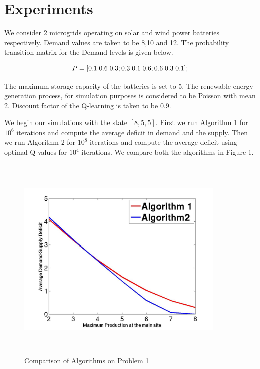 \documentclass[conference]{IEEEtran}
\begin{document}
\section{Experiments}
We consider 2 microgrids operating on solar and wind power batteries respectively. Demand values are taken to be 8,10 and 12. The probability transition matrix for the Demand levels is given below. 

$$ P = [0.1\hspace{0.1cm}0.6\hspace{0.1cm} 0.3; 0.3\hspace{0.1cm} 0.1\hspace{0.1cm} 0.6; 0.6 \hspace{0.1cm}0.3 \hspace{0.1cm}0.1];$$

The maximum storage capacity of the batteries is set to 5. The renewable energy generation process, for simulation purposes is considered to be Poisson with mean 2. Discount factor of the Q-learning is taken to be 0.9.

We begin our simulations with the state $[8,5,5]$. First we run Algorithm 1 for $10^6$ iterations and compute the average deficit in demand and the supply. Then we run Algorithm 2 for $10^8$ iterations and compute the average deficit using optimal Q-values for $10^4$ iterations. We compare both the algorithms in Figure 1.

\begin{figure}[h!]
\begin{center}
 \includegraphics[width = 10cm,height=10cm]{plot1.jpg}
 \caption{Comparison of Algorithms on Problem 1}
 \end{center}
 \end{figure}
\end{document}
